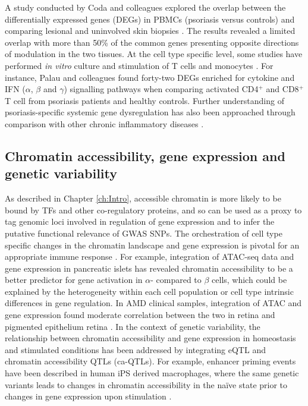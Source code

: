 A study conducted by Coda and colleagues explored the overlap between the differentially expressed genes (DEGs) in PBMCs (psoriasis versus controls) and comparing lesional and uninvolved skin biopsies \parencite{Coda2012}. The results revealed a limited overlap with more than 50\% of the common genes presenting opposite directions of modulation in the two tissues. At the cell type specific level, some studies have performed \textit{in vitro} culture and stimulation of T cells and monocytes \parencite{Palau2013, Jung2004}. For instance, Palau and colleagues found forty-two DEGs enriched for cytokine and IFN ($\alpha$, $\beta$ and $\gamma$) signalling pathways when comparing activated CD4$^+$ and CD8$^+$ T cell from psoriasis patients and healthy controls. Further understanding of psoriasis-specific systemic gene dysregulation has also been approached through comparison with other chronic inflammatory diseases \parencite{Mesko2010}. %


\subsection{Chromatin accessibility, gene expression and genetic variability}
As described in Chapter \ref{ch:Intro}, accessible chromatin is more likely to be bound by TFs and other co-regulatory proteins, and so can be used as a proxy to tag genomic loci involved in regulation of gene expression and to infer the putative functional relevance of GWAS SNPs. The orchestration of cell type specific changes in the chromatin landscape and gene expression is pivotal for an appropriate immune response \parencite{Goodnow2005}. For example, integration of ATAC-seq data and gene expression in pancreatic islets has revealed chromatin accessibility to be a better predictor for gene activation in $\alpha$- compared to $\beta$ cells, which could be explained by the heterogeneity within each cell population or cell type intrinsic differences in gene regulation. In AMD clinical samples, integration of ATAC and gene expression found moderate correlation between the two in retina and pigmented epithelium retina \parencite{Wang2018}. In the context of genetic variability, the relationship between chromatin accessibility and gene expression in homeostasis and stimulated conditions has been addressed by integrating eQTL and chromatin accessibility QTLs (ca-QTLs). For example, enhancer priming events have been described in human iPS derived macrophages, where the same genetic variants leads to changes in chromatin accessibility in the na\"{i}ve state prior to changes in gene expression upon stimulation \parencite{Alasoo2018}. 



